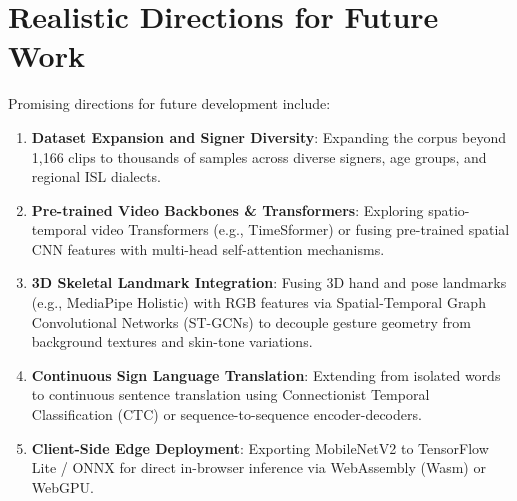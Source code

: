 \section{Realistic Directions for Future Work}
\label{sec:future_work}
Promising directions for future development include:
\begin{enumerate}
    \item \textbf{Dataset Expansion and Signer Diversity}: Expanding the corpus beyond 1,166 clips to thousands of samples across diverse signers, age groups, and regional ISL dialects.
    \item \textbf{Pre-trained Video Backbones & Transformers}: Exploring spatio-temporal video Transformers (e.g., TimeSformer) or fusing pre-trained spatial CNN features with multi-head self-attention mechanisms.
    \item \textbf{3D Skeletal Landmark Integration}: Fusing 3D hand and pose landmarks (e.g., MediaPipe Holistic) with RGB features via Spatial-Temporal Graph Convolutional Networks (ST-GCNs) to decouple gesture geometry from background textures and skin-tone variations.
    \item \textbf{Continuous Sign Language Translation}: Extending from isolated words to continuous sentence translation using Connectionist Temporal Classification (CTC) or sequence-to-sequence encoder-decoders.
    \item \textbf{Client-Side Edge Deployment}: Exporting MobileNetV2 to TensorFlow Lite / ONNX for direct in-browser inference via WebAssembly (Wasm) or WebGPU.
\end{enumerate}
